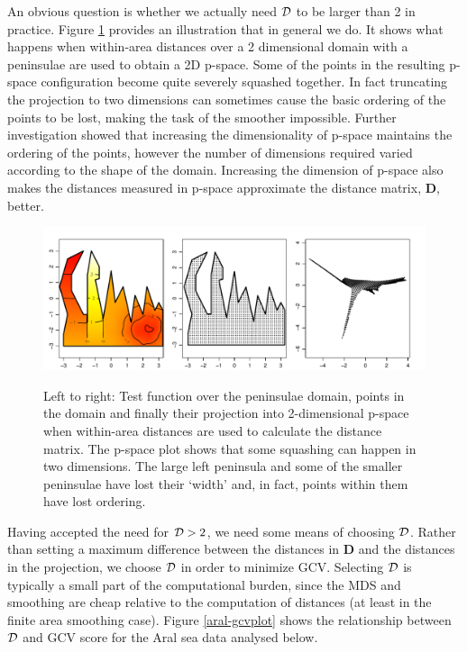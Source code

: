 \documentclass[smallextended]{svjour3}       %
\begin{document}
An obvious question is whether we actually need $\cal D$ to be larger than 2 in practice. Figure \ref{wt2-plot} provides an illustration that in general we do. It shows what happens when within-area distances over a 2 dimensional domain with a peninsulae are used to obtain a 2D p-space. Some of the points in the resulting p-space configuration become quite severely squashed together. In fact truncating the projection to two dimensions can sometimes cause the basic ordering of the points to be lost, making the task of the smoother impossible. Further investigation showed that increasing the dimensionality of p-space maintains the ordering of the points, however the number of dimensions required varied according to the shape of the domain. Increasing the dimension of p-space also makes the distances measured in p-space approximate the distance matrix, $\mathbf{D}$, better.

\begin{figure}
\centering
\includegraphics[width=\textwidth]{examples/wt2/wt2-plot.pdf} \\
\caption{Left to right: Test function over the peninsulae domain, points in the domain and finally their projection into 2-dimensional p-space when within-area distances are used to calculate the distance matrix. The p-space plot shows that some squashing can happen in two dimensions. The large left peninsula and some of the smaller peninsulae have lost their `width' and, in fact, points within them have lost ordering.}
\label{wt2-plot}
\end{figure}

Having accepted the need for ${\cal D}>2$, we need some means of choosing $\cal D$. Rather than setting a maximum difference between the distances in $\mathbf{D}$ and the distances in the projection, we choose $\cal D$ in order to minimize GCV. Selecting $\cal D$ is typically a small part of the computational burden, since the MDS and smoothing are cheap relative to the computation of distances (at least in the finite area smoothing case). Figure \ref{aral-gcvplot} shows the relationship between $\cal D$ and GCV score for the Aral sea data analysed below. 
\end{document}
